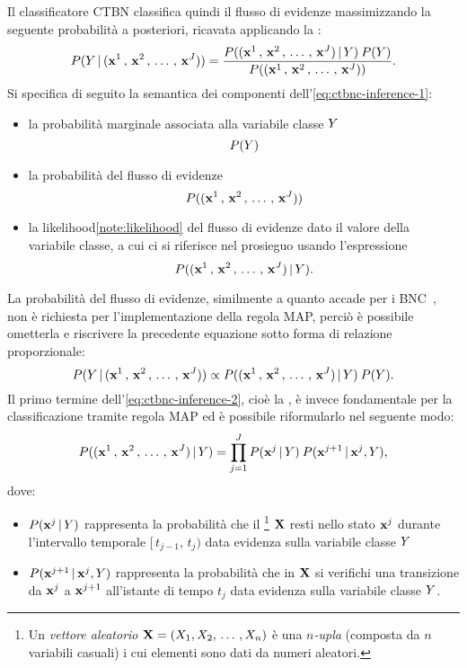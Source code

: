 Il classificatore \acs{CTBN} classifica quindi il flusso di evidenze massimizzando la seguente probabilità a posteriori, ricavata applicando la \emph{}:
\begin{equation}\label{eq:ctbnc-inference-1}
P(\mathnormal{Y}\,\arrowvert\,(\mathbf{x}^1\,,\,\mathbf{x}^2\,,\,\dotsc\,,\,\mathbf{x}^{J}))=\frac{P((\mathbf{x}^1\,,\,\mathbf{x}^2\,,\,\dotsc\,,\,\mathbf{x}^{J})\,\arrowvert\,\mathnormal{Y})\:P(\mathnormal{Y})}{P((\mathbf{x}^1\,,\,\mathbf{x}^2\,,\,\dotsc\,,\,\mathbf{x}^{J}))}\text{.}
\end{equation}
Si specifica di seguito la semantica dei componenti dell'\autoref{eq:ctbnc-inference-1}:
\begin{itemize}
\item la probabilità marginale associata alla variabile classe $\mathnormal{Y}$ \[P(\mathnormal{Y})\]
\item la probabilità del flusso di evidenze \[P((\mathbf{x}^1\,,\,\mathbf{x}^2\,,\,\dotsc\,,\,\mathbf{x}^{J}))\]
\item la likelihood\cref{note:likelihood} del flusso di evidenze dato il valore della variabile classe, a cui ci si riferisce nel prosieguo usando l'espressione \emph{} \[P((\mathbf{x}^1\,,\,\mathbf{x}^2\,,\,\dotsc\,,\,\mathbf{x}^{J})\,\arrowvert\,\mathnormal{Y})\text{.}\]
\end{itemize}
La probabilità del flusso di evidenze, similmente a quanto accade per i \acs{BNC}~\citep{Friedman1997}, non è richiesta per l'implementazione della regola \acs{MAP}, perciò è possibile ometterla e riscrivere la precedente equazione sotto forma di relazione proporzionale:
\begin{equation}\label{eq:ctbnc-inference-2}
P(\mathnormal{Y}\,\arrowvert\,(\mathbf{x}^1\,,\,\mathbf{x}^2\,,\,\dotsc\,,\,\mathbf{x}^{J})) \propto P((\mathbf{x}^1\,,\,\mathbf{x}^2\,,\,\dotsc\,,\,\mathbf{x}^{J})\,\arrowvert\,\mathnormal{Y})\:P(\mathnormal{Y})\text{.}
\end{equation}
Il primo termine dell'\autoref{eq:ctbnc-inference-2}, cioè la \emph{}, è invece fondamentale per la classificazione tramite regola \acs{MAP} ed è possibile riformularlo nel seguente modo:
\begin{equation}\label{eq:ctbnc-inference-3}
P((\mathbf{x}^1\,,\,\mathbf{x}^2\,,\,\dotsc\,,\,\mathbf{x}^{J})\,\arrowvert\,\mathnormal{Y})=\prod_{j=1}^{J} P(\mathbf{x}^j\,\arrowvert\,\mathnormal{Y})\:P(\mathbf{x}^{j+1}\,\arrowvert\,\mathbf{x}^j,\mathnormal{Y})\text{,}
\end{equation}
dove:
\begin{itemize}
    \item $P(\mathbf{x}^j\,\arrowvert\,\mathnormal{Y})$ rappresenta la probabilità che il \emph{}\footnote{\label{note:vettore-aleatorio}Un \emph{vettore aleatorio} $\mathbf{X}=(\mathnormal{X}_1,\mathnormal{X}_2,\,\dotsc\,,\mathnormal{X}_n)$ è una $n$\emph{-upla} (composta da $n$ variabili casuali) i cui elementi sono dati da numeri aleatori.} $\mathbf{X}$ resti nello stato $\mathbf{x}^j$ durante l'intervallo temporale $[\,t_{j-1},\,t_j)$ data evidenza sulla variabile classe $\mathnormal{Y}$
    \item $P(\mathbf{x}^{j+1}\,\arrowvert\,\mathbf{x}^j,\mathnormal{Y})$ rappresenta la probabilità che in $\mathbf{X}$ si verifichi una transizione da $\mathbf{x}^j$ a $\mathbf{x}^{j+1}$ all'istante di tempo $t_j$ data evidenza sulla variabile classe $\mathnormal{Y}$.
\end{itemize}
